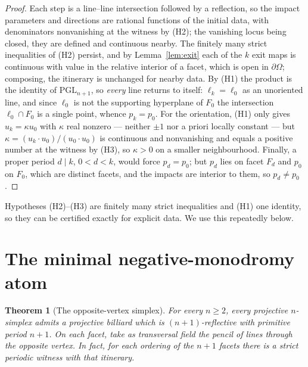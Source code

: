 \documentclass[11pt,a4paper]{article}
\theoremstyle{plain}
\newtheorem{theorem}{Theorem}[section]
\theoremstyle{definition}
\theoremstyle{remark}
\newcommand{\PGL}{\mathrm{PGL}}
\begin{document}
\begin{proof}
Each step is a line--line intersection followed by a reflection, so the impact
parameters and directions are rational functions of the initial data, with
denominators nonvanishing at the witness by (H2); the vanishing locus being closed,
they are defined and continuous nearby. The finitely many strict inequalities of
(H2) persist, and by Lemma~\ref{lem:exit} each of the $k$ exit maps is continuous
with value in the relative interior of a facet, which is open in $\partial\Omega$; composing,
the itinerary is unchanged for nearby data. By (H1) the product is the identity of
$\PGL_{n+1}$, so \emph{every} line returns to itself: $\ell_k=\ell_0$ as an unoriented
line, and since $\ell_0$ is not the supporting hyperplane of $F_0$ the intersection
$\ell_0\cap F_0$ is a single point, whence $p_k=p_0$. For the orientation, (H1)
only gives $u_k=\kappa u_0$ with $\kappa$ real nonzero --- neither $\pm1$ nor a
priori locally constant --- but $\kappa=(u_k\cdot u_0)/(u_0\cdot u_0)$ is
continuous and nonvanishing and equals a positive number at the witness by (H3), so
$\kappa>0$ on a smaller neighbourhood. Finally, a proper period $d\mid k$, $0<d<k$,
would force $p_d=p_0$; but $p_d$ lies on facet $F_d$ and $p_0$ on $F_0$, which are
distinct facets, and the impacts are interior to them, so $p_d\neq p_0$.
\end{proof}

Hypotheses (H2)--(H3) are finitely many strict inequalities and (H1) one identity,
so they can be certified exactly for explicit data.  We use this repeatedly
below.
\section{The minimal negative-monodromy atom}

\begin{theorem}[The opposite-vertex simplex]\label{thm:opposite-simplex}
For every $n\ge2$, every projective $n$-simplex admits a projective billiard
which is $(n+1)$-reflective with primitive period $n+1$.  On each facet, take as
transversal field the pencil of lines through the opposite vertex.  In fact, for
each ordering of the $n+1$ facets there is a strict periodic witness with that
itinerary.
\end{theorem}
\end{document}
